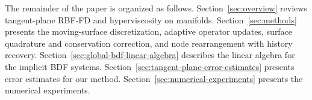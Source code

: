 \documentclass[a4paper,fleqn]{cas-sc}
\begin{document}
The remainder of the paper is organized as follows.
Section~\ref{sec:overview} reviews tangent-plane RBF-FD and hyperviscosity on manifolds.
Section~\ref{sec:methods} presents the moving-surface discretization, adaptive operator updates, surface quadrature and conservation correction, and node rearrangement with history recovery.
Section~\ref{sec:global-bdf-linear-algebra} describes the linear algebra for the implicit BDF systems. Section~\ref{sec:tangent-plane-error-estimates} presents error estimates for our method. Section~\ref{sec:numerical-experiments} presents the numerical experiments.






\end{document}
